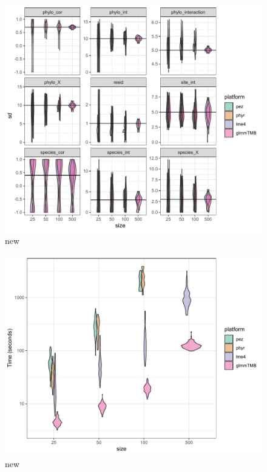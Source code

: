 \documentclass[12pt]{article}
\begin{document}
\begin{center}
\begin{figure}[h]
  \includegraphics[scale=0.8,page=1]{./figure/msplot.pdf}
  \caption{new}
\end{figure}
\end{center}


\begin{center}
\begin{figure}[h]
  \includegraphics[scale=0.8,page=1]{./figure/mstime.pdf}
  \caption{new}
\end{figure}
\end{center}
\end{document}
